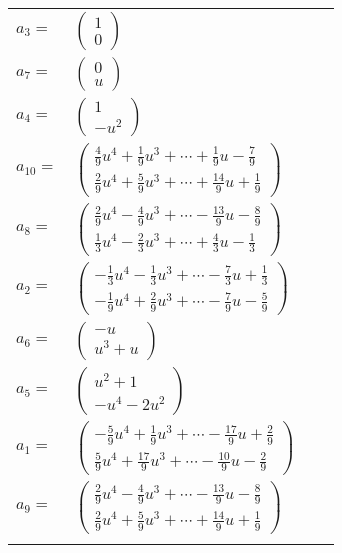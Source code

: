 \documentclass[1p]{elsarticle_modified}
\theoremstyle{definition}
\begin{document}
\begin{tabular}{m{7pt} m{180pt} m{7pt} m{180pt} }
\flushright $a_{3}=$&$\begin{pmatrix}1\\0\end{pmatrix}$ \\
\flushright $a_{7}=$&$\begin{pmatrix}0\\u\end{pmatrix}$ \\
\flushright $a_{4}=$&$\begin{pmatrix}1\\- u^2\end{pmatrix}$ \\
\flushright $a_{10}=$&$\begin{pmatrix}\frac{4}{9} u^4+\frac{1}{9} u^3+\cdots+\frac{1}{9} u-\frac{7}{9}\\\frac{2}{9} u^4+\frac{5}{9} u^3+\cdots+\frac{14}{9} u+\frac{1}{9}\end{pmatrix}$ \\
\flushright $a_{8}=$&$\begin{pmatrix}\frac{2}{9} u^4-\frac{4}{9} u^3+\cdots-\frac{13}{9} u-\frac{8}{9}\\\frac{1}{3} u^4-\frac{2}{3} u^3+\cdots+\frac{4}{3} u-\frac{1}{3}\end{pmatrix}$ \\
\flushright $a_{2}=$&$\begin{pmatrix}-\frac{1}{3} u^4-\frac{1}{3} u^3+\cdots-\frac{7}{3} u+\frac{1}{3}\\-\frac{1}{9} u^4+\frac{2}{9} u^3+\cdots-\frac{7}{9} u-\frac{5}{9}\end{pmatrix}$ \\
\flushright $a_{6}=$&$\begin{pmatrix}- u\\u^3+u\end{pmatrix}$ \\
\flushright $a_{5}=$&$\begin{pmatrix}u^2+1\\- u^4-2 u^2\end{pmatrix}$ \\
\flushright $a_{1}=$&$\begin{pmatrix}-\frac{5}{9} u^4+\frac{1}{9} u^3+\cdots-\frac{17}{9} u+\frac{2}{9}\\\frac{5}{9} u^4+\frac{17}{9} u^3+\cdots-\frac{10}{9} u-\frac{2}{9}\end{pmatrix}$ \\
\flushright $a_{9}=$&$\begin{pmatrix}\frac{2}{9} u^4-\frac{4}{9} u^3+\cdots-\frac{13}{9} u-\frac{8}{9}\\\frac{2}{9} u^4+\frac{5}{9} u^3+\cdots+\frac{14}{9} u+\frac{1}{9}\end{pmatrix}$\\&\end{tabular}
\end{document}
